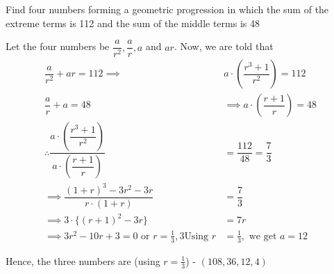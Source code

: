 

\question[4] Find four numbers forming a geometric progression in which the sum of the 
extreme terms is 112 and the sum of the middle terms is 48

\ifprintanswers
\fi 

\begin{solution}[\halfpage]
	Let the four numbers be $\dfrac{a}{r^2}, \dfrac{a}{r}, a$ and $ar$. Now, we are told that
	\begin{align}
		\dfrac{a}{r^2} + ar = 112 \implies &a\cdot\left( \dfrac{r^3+1}{r^2}\right) = 112 \\
		\dfrac{a}{r} + a = 48 &\implies a\cdot\left( \dfrac{r+1}{r}\right) = 48 \\
		\therefore \dfrac{a\cdot\left( \dfrac{r^3+1}{r^2}\right)}
		{a\cdot\left( \dfrac{r+1}{r}\right)} &= \dfrac{112}{48} = \dfrac{7}{3} \\
		\implies \dfrac{(1+r)^3 - 3r^2 - 3r}{r\cdot(1+r)} &= \dfrac{7}{3} \\
		\implies 3\cdot\lbrace (r+1)^2 - 3r\rbrace &= 7r \\
		\implies 3r^2-10r+3 = 0 \text{ or } r = \frac{1}{3}, 3
		\text{Using } r &= \frac{1}{3}, \text{ we get } a = 12
	\end{align}
	
	Hence, the three numbers are (using $r=\frac{1}{3}$) - $(108, 36, 12, 4)$
\end{solution}
\ifprintanswers\begin{codex}\end{codex}\fi
